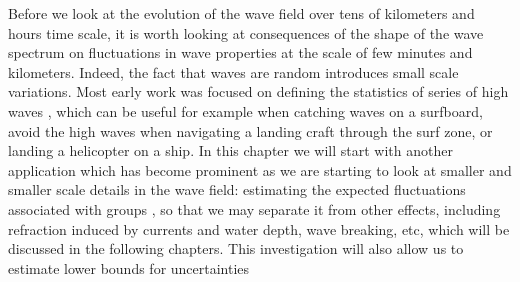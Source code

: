 Before we look at the evolution of the wave field over tens of kilometers and hours time scale, it is 
worth looking at consequences of the shape of the wave spectrum 
on fluctuations in wave properties at the scale of few minutes and kilometers.
Indeed, the fact that waves are random introduces small scale variations. Most early work 
was focused on defining the statistics of series of high waves \citep{Arhan&Ezraty1978,Masson&Chandler1993}, which can be useful for example when catching 
waves on a surfboard, avoid the high waves when navigating a landing craft through the surf zone, or landing a helicopter on a ship. In this 
chapter we will start with another application which has become prominent as we are 
starting to look at smaller and smaller scale details in the wave field: estimating the expected 
fluctuations associated with groups \citep{DeCarlo&al.2023}, so that we may separate it from other effects, including 
refraction induced by currents and water depth, wave breaking, etc, which will be discussed in the 
following chapters. This investigation will also allow us to estimate lower bounds for uncertainties 
